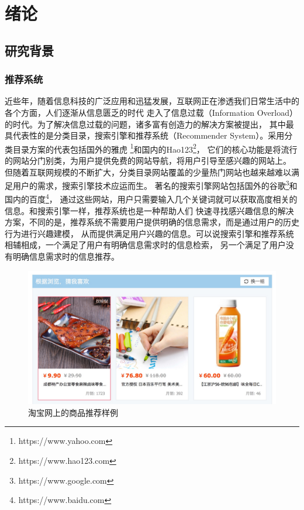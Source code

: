\chapter{绪论}
\section{研究背景}
\subsection{推荐系统}
近些年，随着信息科技的广泛应用和迅猛发展，互联网正在渗透我们日常生活中的各个方面，人们逐渐从信息匮乏的时代
走入了信息过载（Information Overload）的时代。为了解决信息过载的问题，诸多富有创造力的解决方案被提出，
其中最具代表性的是分类目录，搜索引擎和推荐系统（Recommender System）。采用分类目录方案的代表包括国外的雅虎
\footnote{https://www.yahoo.com}和国内的Hao123\footnote{https://www.hao123.com}，
它们的核心功能是将流行的网站分门别类，为用户提供免费的网站导航，将用户引导至感兴趣的网站上。
但随着互联网规模的不断扩大，分类目录网站覆盖的少量热门网站也越来越难以满足用户的需求，搜索引擎技术应运而生。
著名的搜索引擎网站包括国外的谷歌\footnote{https://www.google.com}和国内的百度\footnote{https://www.baidu.com}，
通过这些网站，用户只需要输入几个关键词就可以获取高度相关的信息。和搜索引擎一样，推荐系统也是一种帮助人们
快速寻找感兴趣信息的解决方案，不同的是，推荐系统不需要用户提供明确的信息需求，而是通过用户的历史行为进行兴趣建模，
从而提供满足用户兴趣的信息。可以说搜索引擎和推荐系统相辅相成，一个满足了用户有明确信息需求时的信息检索，
另一个满足了用户没有明确信息需求时的信息推荐。

\begin{figure}[htbp]
\centering
\includegraphics[scale=0.26]{images/taobao.jpeg}
\caption{淘宝网上的商品推荐样例}
\label{fig:taobao}
\end{figure}

